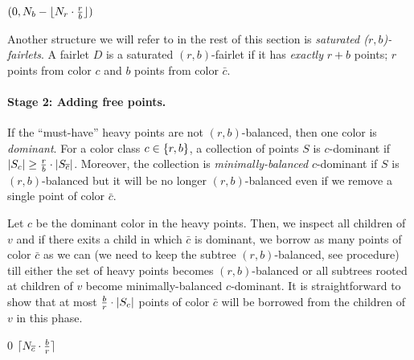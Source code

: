 \begin{algorithm}
\caption{: returns the minimum number of points that are required to be removed so that $(N_r, N_b)$ become $(r,b)$-balanced.}\label{alg:min-unbalanced}
\begin{algorithmic}[1]
	 
	\ENDIF
	\RETURN $(0, N_b - \lfloor {N_r \cdot {r\over b}} \rfloor)$
\end{algorithmic}
\end{algorithm}


Another structure we will refer to in the rest of this section is {\em saturated ($r,b$)-fairlets}. A fairlet $D$ is a saturated $(r,b)$-fairlet if it has {\em exactly} $r+b$ points; $r$ points from color $c$ and $b$ points from color $\bar{c}$. 
\paragraph{Stage 2: Adding free points.}
If the ``must-have'' heavy points are not $(r,b)$-balanced, then one color is {\em dominant}. For a color class $c\in\{r,b\}$, a collection of points $S$ is $c$-dominant if $|S_c| \geq {r\over b}\cdot |S_{\overline{c}}|$. Moreover, the collection is {\em minimally-balanced} $c$-dominant if $S$ is $(r,b)$-balanced but it will be no longer $(r,b)$-balanced even if we remove a single point of color $\bar{c}$.

Let $c$ be the dominant color in the {heavy points}. Then, we inspect all children of $v$ and if there exits a child in which $\bar{c}$ is dominant, we borrow as many points of color $\bar{c}$ as we can (we need to keep the subtree $(r,b)$-balanced, see \Call{\extraPoints} procedure) till either the set of heavy points becomes $(r,b)$-balanced or all subtrees rooted at children of $v$ become minimally-balanced $c$-dominant. It is straightforward to show that at most ${b\over r}\cdot |S_c|$ points of color $\bar{c}$ will be borrowed from the children of $v$ in this phase.

\begin{algorithm}
\caption{: returns the maximum number of points of color $c$ that can be removed from the set $(N_r, N_b)$ such that they remain $(r,b)$-balanced.}\label{alg:extra-points}
\begin{algorithmic}[1]
	 \RETURN $0$ \ENDIF
	\RETURN $\lceil {N_{\overline{c}} \cdot {b\over r}} \rceil$
\end{algorithmic}
\end{algorithm}

